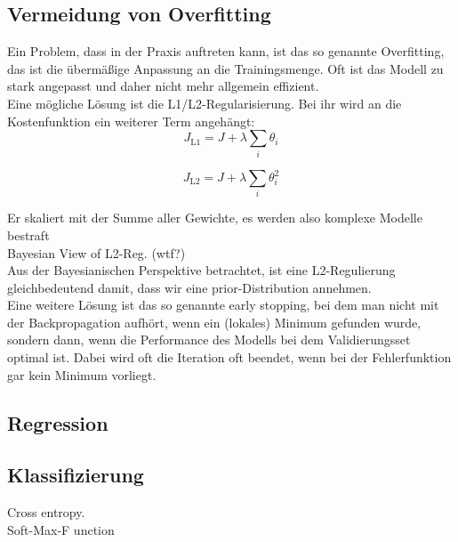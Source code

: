 \subsection{Vermeidung von Overfitting}
Ein Problem, dass in der Praxis auftreten kann, ist das so genannte Overfitting, das ist die übermäßige Anpassung an die Trainingsmenge. Oft ist das Modell zu stark angepasst und daher nicht mehr allgemein effizient.\\

Eine mögliche Lösung ist die L1/L2-Regularisierung. Bei ihr wird an die Kostenfunktion ein weiterer Term angehängt:\\

\begin{equation}
	J_{\text{L1}} = J + \lambda \sum_i \theta_i 
\end{equation}

\begin{equation}
	J_{\text{L2}} = J + \lambda \sum_i \theta_i^2
\end{equation}


Er skaliert mit der Summe aller Gewichte, es werden also komplexe Modelle bestraft 
\\

Bayesian View of L2-Reg. (wtf?)\\

Aus der Bayesianischen Perspektive betrachtet, ist eine L2-Regulierung gleichbedeutend damit, dass wir eine prior-Distribution annehmen. \\
Eine weitere Lösung ist das so genannte early stopping, bei dem man nicht mit der Backpropagation aufhört, wenn ein (lokales) Minimum gefunden wurde, sondern dann, wenn die Performance des Modells bei dem Validierungsset optimal ist. Dabei wird oft die Iteration oft beendet, wenn bei der Fehlerfunktion gar kein Minimum vorliegt. 

\subsection{Regression}

\subsection{Klassifizierung}
Cross entropy.
\\
Soft-Max-F	unction
\\

